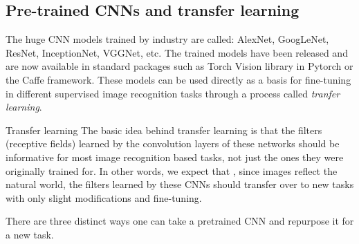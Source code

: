 \subsection{Pre-trained CNNs and transfer learning}
\label{subsec:cnnTransferLearning}
The huge CNN models trained by industry are called: AlexNet, GoogLeNet, ResNet, InceptionNet, VGGNet, etc. The trained models have been released and are now available in standard packages such as Torch Vision library in Pytorch or the Caffe framework. These models can be used directly as a basis for fine-tuning in different supervised image recognition tasks through a process called \emph{tranfer learning}.
\begin{mybox}{Transfer learning}
	The basic idea behind transfer learning is that the filters (receptive fields) learned by the convolution layers of these networks should be informative for most image recognition based tasks, not just the ones they were originally trained for. In other words, we expect that , since images reflect the natural world, the filters learned by these CNNs should transfer over to new tasks with only slight modifications and fine-tuning.
\end{mybox}
There are three distinct ways one can take a pretrained CNN and repurpose it for a new task.

